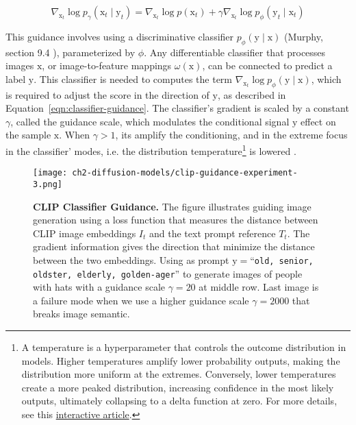 \begin{equation}\label{eqn:classifier-guidance}
\nabla_{\mathrm{x}_{t}}\log p_{\gamma}(\mathrm{x}_{t}\mid\mathrm{y}_{t}) = \nabla_{\mathrm{x}_{t}}\log p(\mathrm{x}_{t}) + \gamma \nabla_{\mathrm{x}_{t}} \log p_{\phi}(\mathrm{y}_{t}\mid\mathrm{x}_{t})
\end{equation}

\noindent This guidance involves using a discriminative classifier $p_{\phi}(\mathrm{y}\mid\mathrm{x})$ (Murphy, section 9.4 \cite{murphy2022probabilistic}), parameterized by $\phi$. Any differentiable classifier that processes images $\mathrm{x}$, or image-to-feature mappings $\omega(\mathrm{x})$, can be connected to predict a label $\mathrm{y}$. This
classifier is needed to computes the term $\nabla_{\mathrm{x}_{t}}\log p_{\phi}(\mathrm{y}\mid\mathrm{x})$, which is required to adjust the score in the direction of $\mathrm{y}$, as described in Equation~\ref{eqn:classifier-guidance}. The classifier's gradient is scaled by a constant
$\gamma$, called the guidance scale, which modulates the conditional signal $\mathrm{y}$ effect on the sample $\mathrm{x}$. When $\gamma>1$, its amplify the conditioning, and in the extreme focus in the classifier' modes, i.e. the distribution temperature\footnote{A temperature is a hyperparameter that controls the outcome distribution in models. Higher temperatures amplify lower probability outputs, making the distribution more uniform at the extremes. Conversely, lower temperatures create a more peaked distribution, increasing confidence in the most likely outputs, ultimately collapsing to a delta function at zero. For more details, see this \href{https://lukesalamone.github.io/posts/what-is-temperature/}{interactive article}.}  is lowered \cite{Dhariwal2021DiffusionMB, dieleman2022guidance}.    \\

\begin{figure}[ht]
    \centering
    \texttt{[image: ch2-diffusion-models/clip-guidance-experiment-3.png]}
    \captionsetup{width=\textwidth} %
    \caption{\textbf{CLIP Classifier Guidance.} The figure illustrates guiding
    image generation using a loss function that measures the distance between
    CLIP image embeddings $I_{t}$ and the text prompt reference $T_{t}$. The gradient information gives the direction that minimize the distance between the two embeddings. Using as prompt $\mathrm{y}=$``\texttt{old, senior, oldster, elderly, golden-ager}'' to generate images of people with hats with a guidance scale $\gamma=20$ at middle row. Last image is a failure mode when we use a higher guidance scale $\gamma=2000$ that breaks image semantic.}
    \label{fig:clip-guidance-old-experiment}
  \end{figure}

